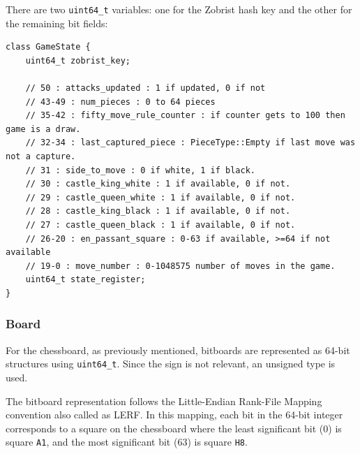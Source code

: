 \vspace{1em}

\noindent There are two \texttt{uint64\_t} variables: one for the Zobrist hash key and the other for the remaining bit fields:

\begin{lstlisting}[breaklines=true, frame=single, caption={GameState class.}]
class GameState {
    uint64_t zobrist_key;

    // 50 : attacks_updated : 1 if updated, 0 if not
    // 43-49 : num_pieces : 0 to 64 pieces
    // 35-42 : fifty_move_rule_counter : if counter gets to 100 then game is a draw.
    // 32-34 : last_captured_piece : PieceType::Empty if last move was not a capture.
    // 31 : side_to_move : 0 if white, 1 if black.
    // 30 : castle_king_white : 1 if available, 0 if not.
    // 29 : castle_queen_white : 1 if available, 0 if not.
    // 28 : castle_king_black : 1 if available, 0 if not.
    // 27 : castle_queen_black : 1 if available, 0 if not.
    // 26-20 : en_passant_square : 0-63 if available, >=64 if not available
    // 19-0 : move_number : 0-1048575 number of moves in the game.
    uint64_t state_register;
}
\end{lstlisting}

\subsubsection{Board}

For the chessboard, as previously mentioned, bitboards are represented as 64-bit structures using \texttt{uint64\_t}. Since the sign is not relevant, an unsigned type is used.

\vspace{1em}

\noindent The bitboard representation follows the Little-Endian Rank-File Mapping convention also called as LERF. In this mapping, each bit in the 64-bit integer corresponds to a square on the chessboard where the least significant bit (0) is square \texttt{A1}, and the most significant bit (63) is square \texttt{H8}.


